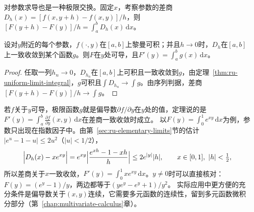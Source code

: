 对参数求导也是一种极限交换。固定$x$，考察参数的差商$D_h(x)=[f(x,y+h)-f(x,y)]/h$，则$[F(y+h)-F(y)]/h=\int_a^bD_h(x)\,\mathrm dx$。
\begin{theorem}[积分号下求导]
\label{thm:ru-differentiation-under-integral}
设对$y$附近的每个参数，$f(\cdot,y)$在$[a,b]$上黎曼可积；并且$h\to0$时，$D_h$在$[a,b]$上一致收敛到某个函数$g$。则$F$在$y$处可导，且$F'(y)=\int_a^bg(x)\,\mathrm dx$。
\end{theorem}
\begin{proof}
任取一列$h_n\to0$，$D_{h_n}$在$[a,b]$上可积且一致收敛到$g$，由定理~\ref{thm:ru-uniform-limit-integral}，$g$可积且$\int D_{h_n}\to\int g$。由序列判据，差商$[F(y+h)-F(y)]/h\to\int g$。
\end{proof}
若$f$关于$y$可导，极限函数$g$就是偏导数$\partial f/\partial y$在$y$处的值，定理说的是$F'(y)=\int_a^b\frac{\partial f}{\partial y}(x,y)\,\mathrm dx$在差商一致收敛时成立。
以$F(y)=\int_0^1e^{xy}\,\mathrm dx$为例，参数只出现在指数因子中。由第~\ref{sec:ru-elementary-limits}节的估计$|e^u-1-u|\leq2u^2$（$|u|<1/2$），
\[
 \Bigl|D_h(x)-xe^{xy}\Bigr|=e^{xy}\Bigl|\frac{e^{xh}-1-xh}h\Bigr|\leq2e^{|y|}|h|,\qquad x\in[0,1],\ |h|<\tfrac12,
\]
所以差商关于$x$一致收敛，$F'(y)=\int_0^1xe^{xy}\,\mathrm dx$。$y\neq0$时可以直接核对：$F(y)=(e^y-1)/y$，两边都等于$(ye^y-e^y+1)/y^2$。
实际应用中更方便的充分条件是偏导数关于$(x,y)$连续，它需要多元函数的连续性，留到多元函数微积分部分（第~\ref{chap:multivariate-calculus}章）。
